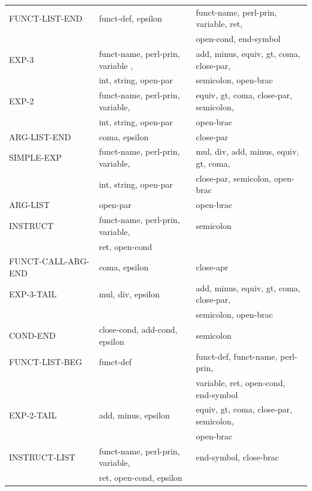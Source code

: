 \documentclass[a4paper,10pt]{article}
\begin{document}
\begin{tabular}{|l|l|l|}
FUNCT-LIST-END 		& funct-def, epsilon					& funct-name, perl-prin, variable, ret,  \\
					&										& open-cond, end-symbol					\\ \hline
EXP-3 				& funct-name, perl-prin, variable ,		& add, minus, equiv, gt, coma, close-par, \\
					& int, string, open-par 				& semicolon, open-brac						\\ \hline
EXP-2 				& funct-name, perl-prin, variable,		& equiv, gt, coma, close-par, semicolon, 	\\
					& int, string, open-par 				& open-brac								\\ \hline
ARG-LIST-END 		& coma, epsilon 						& close-par									\\ \hline
SIMPLE-EXP 			& funct-name, perl-prin, variable, 		& mul, div, add, minus, equiv, gt, coma,	\\
					& int, string, open-par 				& close-par, semicolon, open-brac			\\ \hline
ARG-LIST			& open-par	 							& open-brac									\\ \hline
INSTRUCT 			& funct-name, perl-prin, variable,		& semicolon									\\
					& ret, open-cond						&											\\ \hline
FUNCT-CALL-ARG-END 	& coma, epsilon							& close-apr									\\ \hline
EXP-3-TAIL 			& mul, div, epsilon 					& add, minus, equiv, gt, coma, close-par, 	\\
					&										& semicolon, open-brac						\\ \hline
COND-END 			& close-cond, add-cond, epsilon 		& semicolon									\\
FUNCT-LIST-BEG 		& funct-def 							& funct-def, funct-name, perl-prin, 		\\
					&										& variable, ret, open-cond, end-symbol		\\ \hline
EXP-2-TAIL 			& add, minus, epsilon 					& equiv, gt, coma, close-par, semicolon, 	\\
					&										& open-brac								\\ \hline
INSTRUCT-LIST 		& funct-name, perl-prin, variable, 		& end-symbol, close-brac					\\
					& ret, open-cond, epsilon 				&											\\ \hline

\end{tabular}
 
\end{document}
